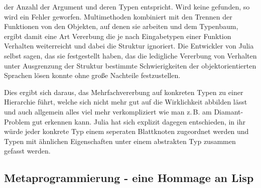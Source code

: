 \documentclass[proseminar,german,utf8]{zihpub}
\newcommand{\zB}[0]{{z.\,B. }}
\begin{document}
der Anzahl der Argument und deren Typen entspricht. Wird keine gefunden, so wird ein Fehler geworfen. Multimethoden kombiniert mit den Trennen der Funktionen von den Objekten, auf denen sie arbeiten und dem Typenbaum, ergibt damit eine Art Vererbung die je nach Eingabetypen einer Funktion Verhalten weiterreicht und dabei die Struktur ignoriert. Die Entwickler von Julia selbst sagen, das sie festgestellt haben, das die ledigliche Vererbung von Verhalten unter Ausgrenzung der Struktur bestimmte Schwierigkeiten der objektorientierten Sprachen lösen konnte ohne große Nachteile festzustellen. 

Dies ergibt sich daraus, das Mehrfachvererbung auf konkreten Typen zu einer Hierarchie führt, welche sich nicht mehr gut auf die Wirklichkeit abbilden lässt und auch allgemein alles viel mehr verkompliziert wie man \zB am Diamant-Problem gut erkennen kann. Julia hat sich explizit dagegen entschieden, in ihr würde jeder konkrete Typ einem seperaten Blattknoten zugeordnet werden und Typen mit ähnlichen Eigenschaften unter einem abstrakten Typ zusammen gefasst werden.~\cite{JuliaLangDocumentation}~\cite{WordpressJuliaOO}~\cite{MultiDispatchWiki}

\subsection{Metaprogrammierung - eine Hommage an Lisp}
\end{document}
